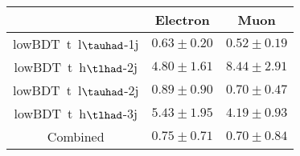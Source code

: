 \centering
\begin{tabular}{|c|c|c|} \hline
 & Electron & Muon\\\hline
lowBDT~t~{l}$\tauhad$-1j & $0.63\pm0.20$ & $0.52\pm0.19$\\\hline
lowBDT~t~{h}$\tlhad$-2j & $4.80\pm1.61$ & $8.44\pm2.91$\\\hline
lowBDT~t~{l}$\tauhad$-2j & $0.89\pm0.90$ & $0.70\pm0.47$\\\hline
lowBDT~t~{h}$\tlhad$-3j & $5.43\pm1.95$ & $4.19\pm0.93$\\\hline
Combined & $0.75\pm0.71$ & $0.70\pm0.84$\\\hline
\end{tabular}
